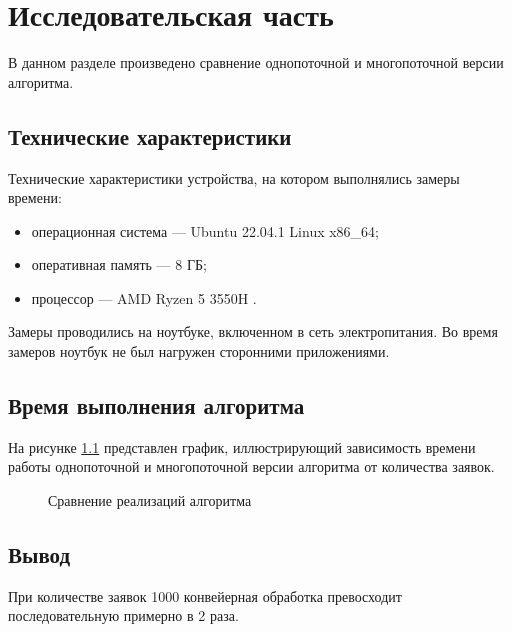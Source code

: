 \chapter{Исследовательская часть}

В данном разделе произведено сравнение однопоточной и многопоточной версии алгоритма.

\section{Технические характеристики}

Технические характеристики устройства, на котором выполнялись замеры времени:

\begin{itemize}
	\item операционная система --- Ubuntu 22.04.1 Linux x86\_64;
	\item оперативная память --- 8 ГБ;
	\item процессор --- AMD Ryzen 5 3550H \cite{amd}.
\end{itemize}

Замеры проводились на ноутбуке, включенном в сеть электропитания. Во время замеров ноутбук не был нагружен сторонними приложениями.

\section{Время выполнения алгоритма}
На рисунке \ref{img:g1} представлен график, иллюстрирующий зависимость времени работы однопоточной и многопоточной версии алгоритма от количества заявок.

\clearpage
\begin{figure}[h!]
	\centering
	\caption{Сравнение реализаций алгоритма}
	\label{img:g1}
\end{figure}

\section*{Вывод} 
При количестве заявок 1000 конвейерная обработка превосходит последовательную примерно в 2 раза.


